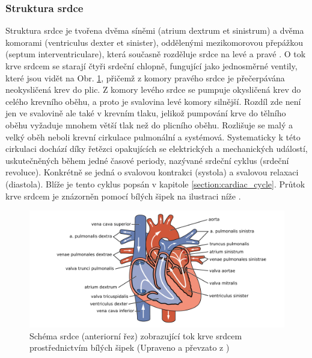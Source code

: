 \subsubsection{Struktura srdce}
\label{section:heart_structure}
Struktura srdce je tvořena dvěma síněmi (atrium dextrum et sinistrum) a dvěma
komorami (ventriculus dexter et sinister), oddělenými mezikomorovou přepážkou
(septum interventriculare), která současně rozděluje srdce na levé a pravé
\cite{Memorix2017}. O tok krve srdcem se starají čtyři srdeční chlopně,
fungující jako jednosměrné ventily, které jsou vidět na Obr.
\ref{fig:heartanatomy}, přičemž z komory pravého srdce je přečerpávána
neokysličená krev do plic. Z komory levého srdce se pumpuje okysličená krev do
celého krevního oběhu, a proto je svalovina levé komory silnější. Rozdíl zde
není jen ve svalovině ale také v krevním tlaku, jelikož pumpování krve do
tělního oběhu vyžaduje mnohem větší tlak než do plicního oběhu. Rozlišuje se
malý a velký oběh neboli krevní cirkulace pulmonální a systémová. Systematicky k
této cirkulaci dochází díky řetězci opakujících se elektrických a mechanických
událostí, uskutečněných během jedné časové periody, nazývané srdeční cyklus
(srdeční revoluce). Konkrétně se jedná o svalovou kontrakci (systola) a svalovou
relaxaci (diastola). Blíže je tento cyklus popsán v kapitole
\ref{section:cardiac_cycle}. Průtok krve srdcem je znázorněn pomocí bílých šipek
na ilustraci níže \cite{Stejfa2006}.

\begin{figure}[h]
	\begin{center}
		\includegraphics[width=1\textwidth]{../assets/anatomy/heart}
		\caption{Schéma srdce (anteriorní řez) zobrazující tok krve srdcem
			prostřednictvím bílých šipek (Upraveno a převzato z
			\cite{OpenStax})}
		\label{fig:heartanatomy}
	\end{center}
\end{figure}

